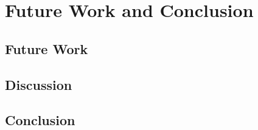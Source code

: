 


\chapter{Future Work and Conclusion}

\label{chapter6} 

\section{Future Work}


\section{Discussion}


\section{Conclusion}
